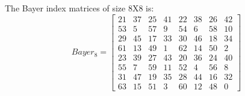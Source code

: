 \documentclass[paper=a4, fontsize=11pt]{scrartcl} %
\numberwithin{equation}{section} %
\numberwithin{figure}{section} %
\numberwithin{table}{section} %
\begin{document}
The Bayer index matrices of size 8X8 is:
\[
Bayer_{8} = 
\begin{bmatrix}
 21  &  37  &  25  &  41 &   22   & 38  &  26   & 42\\
53   &  5   & 57  &   9  &  54    & 6   & 58   & 10\\
29   & 45   & 17  &  33  &  30   & 46  &  18   & 34\\
61   & 13   & 49  &   1  &  62   & 14  &  50  &   2\\
23   & 39   & 27  &  43   & 20   & 36  &  24  &  40\\
55   &  7   & 59  &  11   & 52    & 4   & 56  &   8\\
31   & 47   & 19  &  35   & 28   & 44  &  16  &  32\\
63   & 15   & 51  &   3   & 60   & 12  &  48  &   0
\end{bmatrix}
\]


\end{document}
